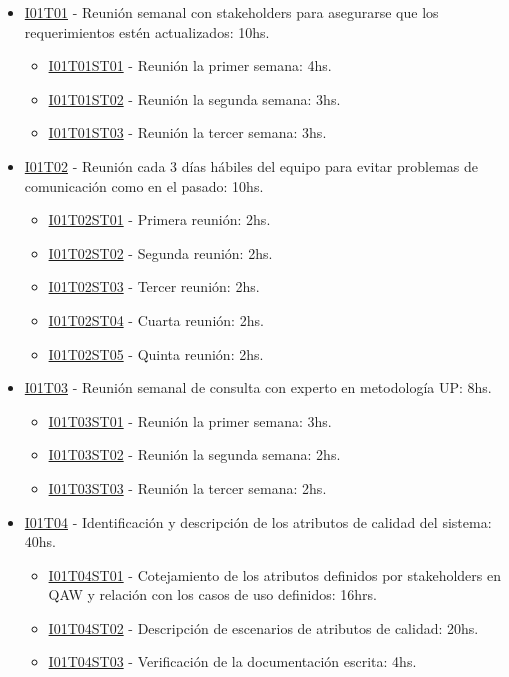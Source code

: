 \begin{itemize}
\item \underline{I01T01} - Reunión semanal con stakeholders para asegurarse que los requerimientos estén actualizados: 10hs.
  \begin{itemize}
    \item \underline{I01T01ST01} - Reunión la primer semana: 4hs.
    \item \underline{I01T01ST02} - Reunión la segunda semana: 3hs.
    \item \underline{I01T01ST03} - Reunión la tercer semana: 3hs.
  \end{itemize}

\item \underline{I01T02} - Reunión cada 3 días hábiles del equipo para evitar problemas de comunicación como en el pasado: 10hs.
  \begin{itemize}
    \item \underline{I01T02ST01} - Primera reunión: 2hs.
    \item \underline{I01T02ST02} - Segunda reunión: 2hs.
    \item \underline{I01T02ST03} - Tercer reunión: 2hs.
    \item \underline{I01T02ST04} - Cuarta reunión: 2hs.
    \item \underline{I01T02ST05} - Quinta reunión: 2hs.
  \end{itemize}

\item \underline{I01T03} - Reunión semanal de consulta con experto en metodología UP: 8hs.
  \begin{itemize}
    \item \underline{I01T03ST01} - Reunión la primer semana: 3hs.
    \item \underline{I01T03ST02} - Reunión la segunda semana: 2hs.
    \item \underline{I01T03ST03} - Reunión la tercer semana: 2hs.
  \end{itemize}

\item \underline{I01T04} - Identificación y descripción de los atributos de calidad del sistema: 40hs.
  \begin{itemize}
    \item \underline{I01T04ST01} - Cotejamiento de los atributos definidos por stakeholders en QAW y relación con los casos de uso definidos: 16hrs.
    \item \underline{I01T04ST02} - Descripción de escenarios de atributos de calidad: 20hs.
    \item \underline{I01T04ST03} - Verificación de la documentación escrita: 4hs.
  \end{itemize}


\end{itemize}
